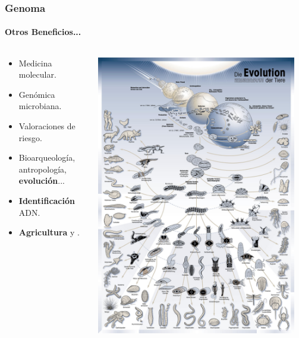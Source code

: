 \begin{frame}
\frametitle{Genoma}
\framesubtitle{Otros Beneficios...}
\begin{columns}
\begin{column}{0.6\textwidth}
\begin{itemize}
    \item Medicina molecular.
    \item Genómica microbiana.
    \item Valoraciones de riesgo.
    \item Bioarqueología, antropología, \textbf{evolución}...
    \item \textbf{Identificación} ADN.
    \item \textbf{Agricultura} y .
\end{itemize}
\end{column}
\begin{column}{0.4\textwidth}
	\begin{center}
		\includegraphics[width=0.95\textwidth]{img/evolution.jpg}
	\end{center}
\end{column}
\end{columns}
\end{frame}

